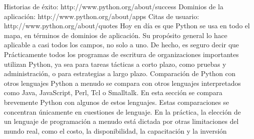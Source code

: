 Historias de éxito: http://www.python.org/about/success
Dominios de la aplicación: http://www.python.org/about/apps
Citas de usuario: http://www.python.org/about/quotes
Hoy en día es que Python se usa en todo el mapa, en términos de dominios de aplicación.
Su propósito general lo hace aplicable a casi todos los campos, no solo a uno. De hecho, es
seguro decir que Prácticamente todos los programas de escritura de organizaciones
importantes utilizan Python, ya sea para tareas tácticas a corto plazo, como pruebas y
administración, o para estrategias a largo plazo.
Comparación de Python con otros lenguajes
Python a menudo se compara con otros lenguajes interpretados como Java, JavaScript, Perl,
Tcl o Smalltalk. En esta sección se compara brevemente Python con algunos de estos
lenguajes. Estas comparaciones se concentran únicamente en cuestiones de lenguaje. En la
práctica, la elección de un lenguaje de programación a menudo está dictada por otras
limitaciones del mundo real, como el costo, la disponibilidad, la capacitación y la inversión

